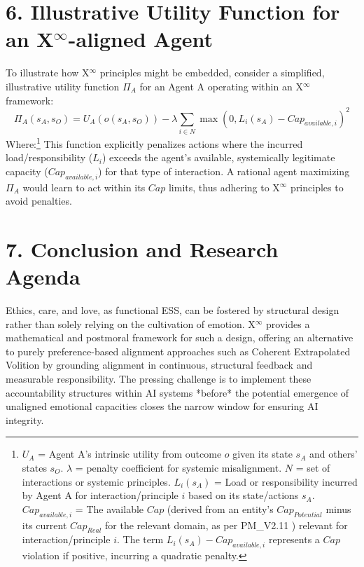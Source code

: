 \documentclass[11pt]{article}
\begin{document}
\section*{6. Illustrative Utility Function for an X$^\infty$-aligned Agent}
To illustrate how X$^\infty$ principles might be embedded, consider a simplified, illustrative utility function $\Pi_A$ for an Agent A operating within an X$^\infty$ framework:
$$ \Pi_A(s_A, s_O) = U_A(o(s_A, s_O)) - \lambda \sum_{i \in N} \max(0, L_i(s_A) - Cap_{available,i})^2 $$
Where:\footnote{$U_A$ = Agent A's intrinsic utility from outcome $o$ given its state $s_A$ and others' states $s_O$. $\lambda$ = penalty coefficient for systemic misalignment. $N$ = set of interactions or systemic principles. $L_i(s_A)$ = Load or responsibility incurred by Agent A for interaction/principle $i$ based on its state/actions $s_A$. $Cap_{available,i}$ = The available $Cap$ (derived from an entity's $Cap_{Potential}$ minus its current $Cap_{Real}$ for the relevant domain, as per PM\_V2.11 \cite{XInfinityPM}) relevant for interaction/principle $i$. The term $L_i(s_A) - Cap_{available,i}$ represents a $Cap$ violation if positive, incurring a quadratic penalty.}
This function explicitly penalizes actions where the incurred load/responsibility ($L_i$) exceeds the agent's available, systemically legitimate capacity ($Cap_{available,i}$) for that type of interaction. A rational agent maximizing $\Pi_A$ would learn to act within its $Cap$ limits, thus adhering to X$^\infty$ principles to avoid penalties.

\section*{7. Conclusion and Research Agenda}
Ethics, care, and love, as functional ESS, can be fostered by structural design rather than solely relying on the cultivation of emotion. X$^\infty$ provides a mathematical and postmoral framework for such a design, offering an alternative to purely preference-based alignment approaches such as Coherent Extrapolated Volition \cite{Yudkowsky2004} by grounding alignment in continuous, structural feedback and measurable responsibility. The pressing challenge is to implement these accountability structures within AI systems *before* the potential emergence of unaligned emotional capacities closes the narrow window for ensuring AI integrity.
\end{document}
